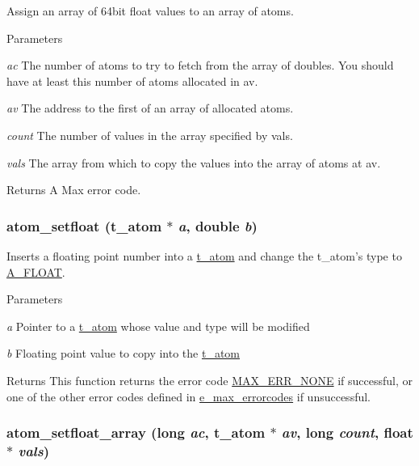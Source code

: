 Assign an array of 64bit float values to an array of atoms. 
\begin{DoxyParams}{Parameters}
\item[{\em ac}]The number of atoms to try to fetch from the array of doubles. You should have at least this number of atoms allocated in av. \item[{\em av}]The address to the first of an array of allocated atoms. \item[{\em count}]The number of values in the array specified by vals. \item[{\em vals}]The array from which to copy the values into the array of atoms at av. \end{DoxyParams}
\begin{DoxyReturn}{Returns}
A Max error code. 
\end{DoxyReturn}
\hypertarget{group__atom_gae4faf28f99370e1a4ae9eab7df5bede7}{
\subsubsection[{atom\_\-setfloat}]{ atom\_\-setfloat ({\bf t\_\-atom} $\ast$ {\em a}, \/  double {\em b})}}
\label{group__atom_gae4faf28f99370e1a4ae9eab7df5bede7}


Inserts a floating point number into a \hyperlink{structt__atom}{t\_\-atom} and change the t\_\-atom's type to \hyperlink{group__atom_gga8aa6700e9f00b132eb376db6e39ade47a0b3aa0ab8104573dfc9cb70b5b08031f}{A\_\-FLOAT}. 
\begin{DoxyParams}{Parameters}
\item[{\em a}]Pointer to a \hyperlink{structt__atom}{t\_\-atom} whose value and type will be modified \item[{\em b}]Floating point value to copy into the \hyperlink{structt__atom}{t\_\-atom}\end{DoxyParams}
\begin{DoxyReturn}{Returns}
This function returns the error code \hyperlink{group__misc_gga0764dd6c02b76cca7d053ae50555d69da6d22f77fef8b1e1b074cef5d29d935fd}{MAX\_\-ERR\_\-NONE} if successful, or one of the other error codes defined in \hyperlink{group__misc_ga0764dd6c02b76cca7d053ae50555d69d}{e\_\-max\_\-errorcodes} if unsuccessful. 
\end{DoxyReturn}
\hypertarget{group__atom_ga05d828d4c2a60274cf185cbcb50df208}{
\subsubsection[{atom\_\-setfloat\_\-array}]{ atom\_\-setfloat\_\-array (long {\em ac}, \/  {\bf t\_\-atom} $\ast$ {\em av}, \/  long {\em count}, \/  float $\ast$ {\em vals})}}
\label{group__atom_ga05d828d4c2a60274cf185cbcb50df208}



